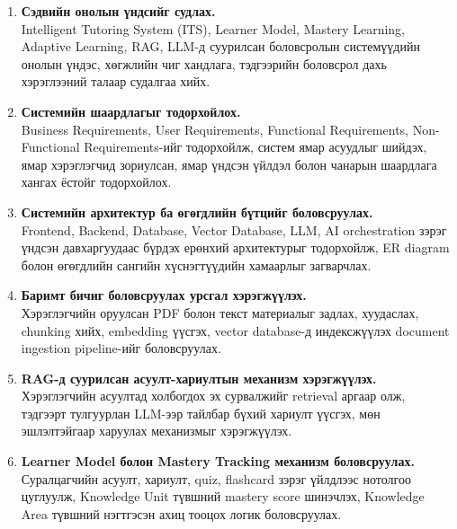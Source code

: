 \documentclass[12pt,A4]{report}
\newcommand{\eng}[1]{#1}
\begin{document}
\begin{enumerate}
    \item \textbf{Сэдвийн онолын үндсийг судлах.} \\
    \eng{Intelligent Tutoring System (ITS)}, \eng{Learner Model}, \eng{Mastery Learning}, \eng{Adaptive Learning}, \eng{RAG}, \eng{LLM}-д суурилсан боловсролын системүүдийн онолын үндэс, хөгжлийн чиг хандлага, тэдгээрийн боловсрол дахь хэрэглээний талаар судалгаа хийх.

    \item \textbf{Системийн шаардлагыг тодорхойлох.} \\
    \eng{Business Requirements}, \eng{User Requirements}, \eng{Functional Requirements}, \eng{Non-Functional Requirements}-ийг тодорхойлж, систем ямар асуудлыг шийдэх, ямар хэрэглэгчид зориулсан, ямар үндсэн үйлдэл болон чанарын шаардлага хангах ёстойг тодорхойлох.

    \item \textbf{Системийн архитектур ба өгөгдлийн бүтцийг боловсруулах.} \\
    \eng{Frontend}, \eng{Backend}, \eng{Database}, \eng{Vector Database}, \eng{LLM}, \eng{AI orchestration} зэрэг үндсэн давхаргуудаас бүрдэх ерөнхий архитектурыг тодорхойлж, \eng{ER diagram} болон өгөгдлийн сангийн хүснэгтүүдийн хамаарлыг загварчлах.

    \item \textbf{Баримт бичиг боловсруулах урсгал хэрэгжүүлэх.} \\
    Хэрэглэгчийн оруулсан \eng{PDF} болон текст материалыг задлах, хуудаслах, \eng{chunking} хийх, \eng{embedding} үүсгэх, \eng{vector database}-д индексжүүлэх \eng{document ingestion pipeline}-ийг боловсруулах.

    \item \textbf{\eng{RAG}-д суурилсан асуулт-хариултын механизм хэрэгжүүлэх.} \\
    Хэрэглэгчийн асуултад холбогдох эх сурвалжийг retrieval аргаар олж, тэдгээрт тулгуурлан \eng{LLM}-ээр тайлбар бүхий хариулт үүсгэх, мөн эшлэлтэйгаар харуулах механизмыг хэрэгжүүлэх.

    \item \textbf{\eng{Learner Model} болон \eng{Mastery Tracking} механизм боловсруулах.} \\
    Суралцагчийн асуулт, хариулт, \eng{quiz}, \eng{flashcard} зэрэг үйлдлээс нотолгоо цуглуулж, \eng{Knowledge Unit} түвшний \eng{mastery score} шинэчлэх, \eng{Knowledge Area} түвшний нэгтгэсэн ахиц тооцох логик боловсруулах.


\end{enumerate}
\end{document}
